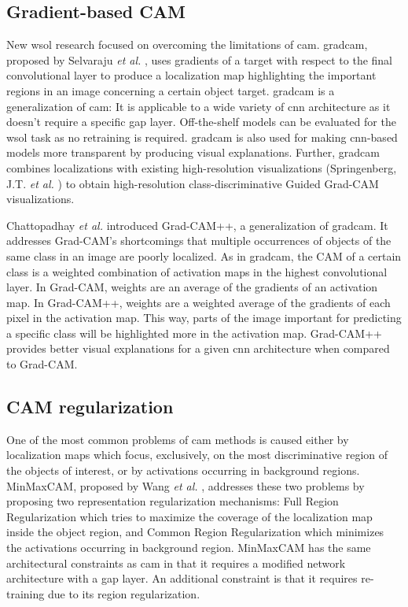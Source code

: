 \subsection{Gradient-based CAM}
New \acrshort{wsol} research focused on overcoming the limitations of \acrshort{cam}. \acrfull{gradcam}, proposed by Selvaraju \textit{et al.} \cite{selvaraju2017grad}, uses gradients of a target with respect to the final convolutional layer to produce a localization map highlighting the important regions in an image concerning a certain object target. \acrshort{gradcam} is a generalization of \acrshort{cam}: It is applicable to a wide variety of \acrshort{cnn} architecture as it doesn't require a specific \acrshort{gap} layer. Off-the-shelf models can be evaluated for the \acrshort{wsol} task as no retraining is required. \acrshort{gradcam} is also used for making \acrshort{cnn}-based models more transparent by producing visual explanations. Further, \acrshort{gradcam} combines localizations with existing high-resolution visualizations (Springenberg, J.T. \textit{et al.} \cite{springenberg2014striving}) to obtain high-resolution class-discriminative Guided Grad-CAM visualizations.

Chattopadhay \textit{et al.} \cite{chattopadhay2018grad, chattopadhyay2017grad} introduced Grad-CAM++, a generalization of \acrshort{gradcam}. It addresses Grad-CAM's shortcomings that multiple occurrences of objects of the same class in an image are poorly localized. As in \acrshort{gradcam}, the CAM of a certain class is a weighted combination of activation maps in the highest convolutional layer. In Grad-CAM, weights are an average of the gradients of an activation map. In Grad-CAM++, weights are a weighted average of the gradients of each pixel in the activation map. This way, parts of the image important for predicting a specific class will be highlighted more in the activation map. Grad-CAM++ provides better visual explanations for a given \acrshort{cnn} architecture when compared to Grad-CAM.

\subsection{CAM regularization}
One of the most common problems of \acrshort{cam} methods is caused either by localization maps which focus, exclusively, on the most discriminative region of the objects of interest, or by activations occurring in background regions. MinMaxCAM, proposed by Wang \textit{et al.} \cite{wang2021minmaxcam}, addresses these two problems by proposing two representation regularization mechanisms: Full Region Regularization which tries to maximize the coverage of the localization map inside the object region, and Common Region Regularization which minimizes the activations occurring in background region. MinMaxCAM has the same architectural constraints as \acrshort{cam} in that it requires a modified network architecture with a \acrshort{gap} layer. An additional constraint is that it requires re-training due to its region regularization.

